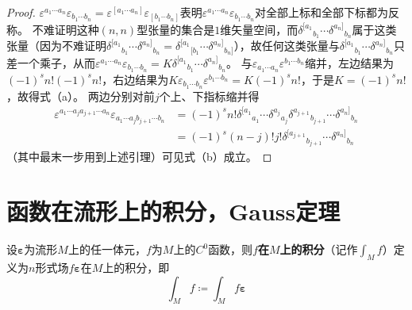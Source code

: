 \begin{proof}
    $\varepsilon^{a_1 \cdots a_n}\varepsilon_{b_1 \cdots b_n} = \varepsilon^{[a_1 \cdots a_n]}\varepsilon_{[b_1 \cdots b_n]}$表明$\varepsilon^{a_1 \cdots a_n}\varepsilon_{b_1 \cdots b_n}$对全部上标和全部下标都为反称。
    不难证明这种$(n, n)$型张量的集合是$1$维矢量空间，而$\delta^{[a_1}{}_{b_1} \cdots \delta^{a_n]}{}_{b_n}$属于这类张量（因为不难证明$\delta^{[a_1}{}_{b_1} \cdots \delta^{a_n]}{}_{b_n} = \delta^{[a_1}{}_{[b_1} \cdots \delta^{a_n]}{}_{b_n]}$），故任何这类张量与$\delta^{[a_1}{}_{b_1} \cdots \delta^{a_n]}{}_{b_n}$只差一个乘子，从而$\varepsilon^{a_1 \cdots a_n}\varepsilon_{b_1 \cdots b_n} = K\delta^{[a_1}{}_{b_1} \cdots \delta^{a_n]}{}_{b_n}$。
    与$\varepsilon_{a_1 \cdots a_n}\varepsilon^{b_1 \cdots b_n}$缩并，左边结果为$(-1)^sn!(-1)^sn!$，右边结果为$K\varepsilon_{b_1 \cdots b_n}\varepsilon^{b_1 \cdots b_n} = K(-1)^sn!$，于是$K = (-1)^sn!$，故得式（a）。
    两边分别对前$j$个上、下指标缩并得
    \[\begin{split}
        \varepsilon^{a_1 \cdots a_j a_{j + 1} \cdots a_n}\varepsilon_{a_1 \cdots a_j b_{j + 1} \cdots b_n} & = (-1)^sn!\delta^{[a_1}{}_{a_1} \cdots \delta^{a_j}{}_{a_j}\delta^{a_{j + 1}}{}_{b_{j + 1}} \cdots \delta^{a_n]}{}_{b_n} \\
        & = (-1)^s(n - j)!j!\delta^{[a_{j + 1}}{}_{b_{j + 1}} \cdots \delta^{a_n]}{}_{b_n}
    \end{split}\]
    （其中最末一步用到上述引理）可见式（b）成立。
\end{proof}

\section{函数在流形上的积分，Gauss定理}

\begin{definition}
    设$\bm\varepsilon$为流形$M$上的任一体元，$f$为$M$上的$C^0$函数，则\textbf{$f$在$M$上的积分}（记作$\displaystyle\int_Mf$）定义为$n$形式场$f\bm\varepsilon$在$M$上的积分，即
    $$\int_Mf \coloneq \int_Mf\bm\varepsilon$$
\end{definition}

